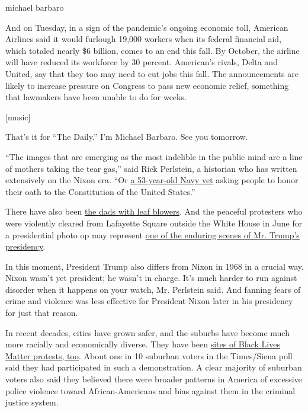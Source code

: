 michael barbaro

And on Tuesday, in a sign of the pandemic's ongoing economic toll,
American Airlines said it would furlough 19,000 workers when its federal
financial aid, which totaled nearly \$6 billion, comes to an end this
fall. By October, the airline will have reduced its workforce by 30
percent. American's rivals, Delta and United, say that they too may need
to cut jobs this fall. The announcements are likely to increase pressure
on Congress to pass new economic relief, something that lawmakers have
been unable to do for weeks.

{[}music{]}

That's it for ``The Daily.'' I'm Michael Barbaro. See you tomorrow.

``The images that are emerging as the most indelible in the public mind
are a line of mothers taking the tear gas,'' said Rick Perlstein, a
historian who has written extensively on the Nixon era. ``Or
\href{https://www.nytimes3xbfgragh.onion/2020/07/20/us/portland-protests-navy-christopher-david.html}{a
53-year-old Navy vet} asking people to honor their oath to the
Constitution of the United States.''

There have also been
\href{https://www.oregonlive.com/news/2020/07/dad-with-leaf-blower-arrested-tuesday-says-he-was-taken-to-ground-by-federal-officers-during-portland-protest.html}{the
dads with leaf blowers}. And the peaceful protesters who were violently
cleared from Lafayette Square outside the White House in June for a
presidential photo op may represent
\href{https://www.nytimes3xbfgragh.onion/2020/06/02/us/politics/trump-walk-lafayette-square.html}{one
of the enduring scenes of Mr. Trump's presidency}.

In this moment, President Trump also differs from Nixon in 1968 in a
crucial way. Nixon wasn't yet president; he wasn't in charge. It's much
harder to run against disorder when it happens on your watch, Mr.
Perlstein said. And fanning fears of crime and violence was less
effective for President Nixon later in his presidency for just that
reason.

In recent decades, cities have grown safer, and the suburbs have become
much more racially and economically diverse. They have been
\href{https://www.bloomberg.com/news/features/2020-06-19/protests-for-racial-justice-take-root-in-suburbia}{sites
of Black Lives Matter protests, too}. About one in 10 suburban voters in
the Times/Siena poll said they had participated in such a demonstration.
A clear majority of suburban voters also said they believed there were
broader patterns in America of excessive police violence toward
African-Americans and bias against them in the criminal justice system.

